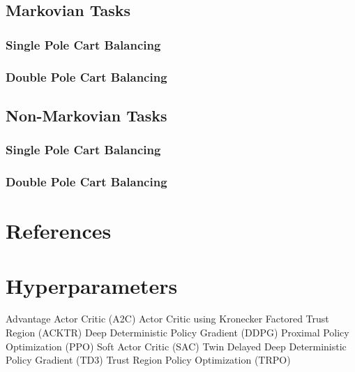 \documentclass{article}
\begin{document}
\subsection{Markovian Tasks}
\subsubsection{Single Pole Cart Balancing}
\subsubsection{Double Pole Cart Balancing}

\subsection{Non-Markovian Tasks}
\subsubsection{Single Pole Cart Balancing}
\subsubsection{Double Pole Cart Balancing}

\section*{References}

\section{Hyperparameters}

Advantage Actor Critic (A2C)
Actor Critic using Kronecker Factored Trust Region (ACKTR)
Deep Deterministic Policy Gradient (DDPG)
Proximal Policy Optimization (PPO)
Soft Actor Critic (SAC)
Twin Delayed Deep Deterministic Policy Gradient (TD3)
Trust Region Policy Optimization (TRPO)
\end{document}
